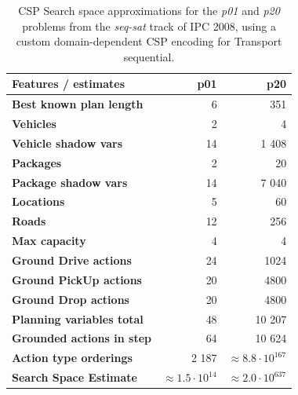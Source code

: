 


\begin{table}[tb]
\begin{center}
\begin{tabular}{l||rr}
\textbf{Features / estimates} & \textbf{p01} & \textbf{p20} \\ 
\midrule
\midrule
\textbf{Best known plan length} & 6 & 351 \\ 
\textbf{Vehicles} & 2 & 4 \\ 
\textbf{Vehicle shadow vars} & 14 & 1 408 \\
\textbf{Packages} & 2 & 20 \\ 
\textbf{Package shadow vars} & 14 & 7 040 \\
\textbf{Locations} & 5 & 60 \\ 
\textbf{Roads} & 12 & 256 \\
\textbf{Max capacity} & 4 & 4 \\ 
\midrule
\textbf{Ground Drive actions} & 24 & 1024 \\ 
\textbf{Ground PickUp actions} & 20 & 4800 \\ 
\textbf{Ground Drop actions} & 20 & 4800 \\ 
\midrule
\textbf{Planning variables total} & 48 & 10 207 \\ 
\textbf{Grounded actions in step} & 64 & 10 624 \\ 
\textbf{Action type orderings} & 2 187 & $\approx 8.8 \cdot 10^{167}$ \\ 
\textbf{Search Space Estimate} & $\approx 1.5 \cdot 10^{14}$ & $\approx 2.0 \cdot 10^{637}$ \\
\end{tabular}
\end{center}
\caption[Search space approximations for a domain-dependent CSP encoding.]{CSP Search space approximations for the \textit{p01} and \textit{p20} problems from the \textit{seq-sat} track of IPC 2008, using a custom domain-dependent CSP encoding for Transport sequential.}
\label{tab:csp-custom}
\end{table}

